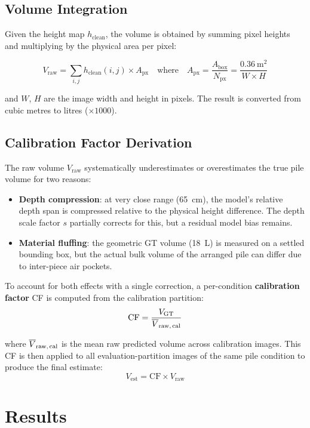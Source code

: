 \documentclass[11pt,a4paper]{article}
\begin{document}
\subsection{Volume Integration}

Given the height map $h_\text{clean}$, the volume is obtained by summing pixel heights and
multiplying by the physical area per pixel:

\[
    V_\text{raw} = \sum_{i,j} h_\text{clean}(i,j) \times A_\text{px}
    \quad \text{where} \quad
    A_\text{px} = \frac{A_\text{box}}{N_\text{px}} = \frac{0.36~\text{m}^2}{W \times H}
\]

and $W$, $H$ are the image width and height in pixels. The result is converted from cubic
metres to litres ($\times 1000$).

\subsection{Calibration Factor Derivation}
\label{sec:calibration}

The raw volume $V_\text{raw}$ systematically underestimates or overestimates the true pile
volume for two reasons:

\begin{itemize}
    \item \textbf{Depth compression}: at very close range (65~cm), the model's relative depth
    span is compressed relative to the physical height difference. The depth scale factor $s$
    partially corrects for this, but a residual model bias remains.
    \item \textbf{Material fluffing}: the geometric GT volume (18~L) is measured on a settled
    bounding box, but the actual bulk volume of the arranged pile can differ due to inter-piece
    air pockets.
\end{itemize}

To account for both effects with a single correction, a per-condition \textbf{calibration
factor} CF is computed from the calibration partition:
\[
    \text{CF} = \frac{V_\text{GT}}{\overline{V}_\text{raw,\,cal}}
\]

where $\overline{V}_\text{raw,\,cal}$ is the mean raw predicted volume across calibration
images. This CF is then applied to all evaluation-partition images of the same pile condition
to produce the final estimate:
\[
    V_\text{est} = \text{CF} \times V_\text{raw}
\]

\section{Results}
\label{sec:results}
\end{document}

